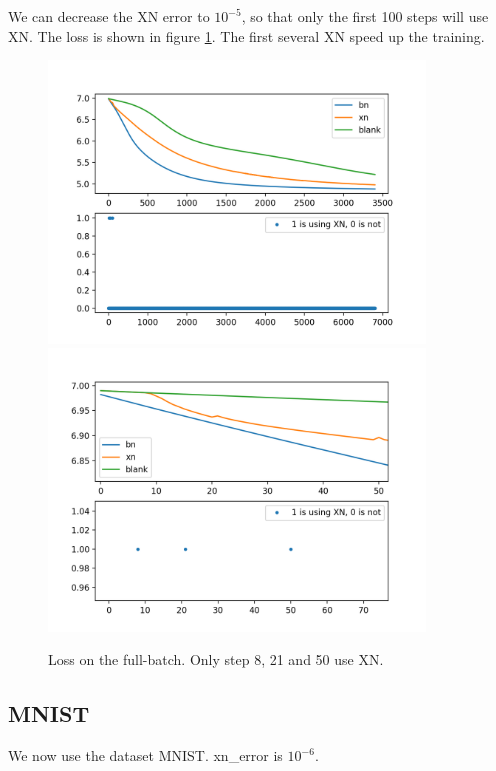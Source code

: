 We can decrease the XN error to $10^{-5}$, so  that only the first 100 steps will use XN. The loss is shown in figure \ref{fig:XN_points_full_100}. The first several XN speed up the training.
\begin{figure}[H]
	\center
	\includegraphics*[width=10cm]{./figures/XN1.png}
	\includegraphics*[width=10cm]{./figures/XN_Points_full_1e5.png}
	\caption{Loss on the full-batch. Only step 8, 21 and 50 use XN.}
	\label{fig:XN_points_full_100}
\end{figure}

\subsection{MNIST}
We now use the dataset MNIST. xn\_error is $10^{-6}$.

